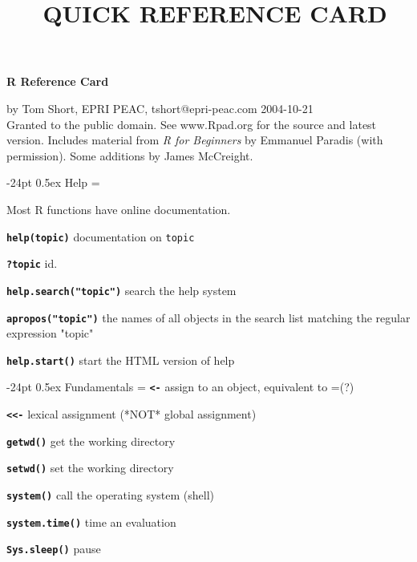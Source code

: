 \documentclass[10pt,landscape]{article}
\title{\content\ QUICK REFERENCE CARD}
\makeatletter
\renewcommand\section{\@startsection{section}{1}{0mm}%
                                     {-24pt}%
                                     {0.5ex}%
                                {\color{blue}\normalfont\large\bfseries}}
\newcommand{\code}{\texttt}
\newcommand{\bcode}[1]{\texttt{\textbf{#1}}}
\makeatother
\begin{document}
\footnotesize
\begin{multicols*}{3}

\setlength{\premulticols}{1pt}
\setlength{\postmulticols}{1pt}
\setlength{\multicolsep}{1pt}
\setlength{\columnsep}{2pt}

\begin{center}
     \Large{\textbf{\color{blue}R Reference Card}} \\
\end{center}

by Tom Short, EPRI PEAC, tshort@epri-peac.com    2004-10-21\\
Granted to the public domain. See www.Rpad.org for the source and latest version.
Includes material from \emph{R for Beginners} by Emmanuel Paradis
(with permission). Some additions by James McCreight.

\section{Help}
\everypar={\hangindent=9mm}

Most R functions have online documentation.

\bcode{help(topic)} documentation on \code{topic}

\bcode{?topic} id.

\bcode{help.search("topic")} search the help system

\bcode{apropos("topic")} the names of all objects in the search list
matching the regular expression "topic"

\bcode{help.start()} start the HTML version of help

\section{Fundamentals}
\everypar={\hangindent=9mm}
\bcode{<-} assign to an object, equivalent to =(?)

\bcode{<<-} lexical assignment (*NOT* global assignment)

\bcode{getwd()} get the working directory

\bcode{setwd()} set the working directory

\bcode{system()} call the operating system (shell)

\bcode{system.time()} time an evaluation

\bcode{Sys.sleep()} pause


\end{multicols*}
\end{document}
